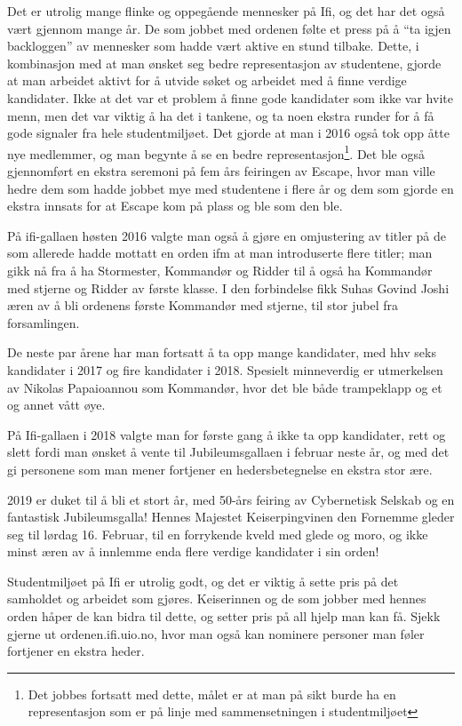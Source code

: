 Det er utrolig mange flinke og oppegående mennesker på Ifi, og det har det også vært gjennom mange år. De som jobbet med ordenen følte et press på å ``ta igjen backloggen'' av mennesker som hadde vært aktive en stund tilbake. Dette, i kombinasjon med at man ønsket seg bedre representasjon av studentene, gjorde at man arbeidet aktivt for å utvide søket og arbeidet med å finne verdige kandidater. Ikke at det var et problem å finne gode kandidater som ikke var hvite menn, men det var viktig å ha det i tankene, og ta noen ekstra runder for å få gode signaler fra hele studentmiljøet. Det gjorde at man i 2016 også tok opp åtte nye medlemmer, og man begynte å se en bedre representasjon\footnote{Det jobbes fortsatt med dette, målet er at man på sikt burde ha en representasjon som er på linje med sammensetningen i studentmiljøet}. Det ble også gjennomført en ekstra seremoni på fem års feiringen av Escape, hvor man ville hedre dem som hadde jobbet mye med studentene i flere år og dem som gjorde en ekstra innsats for at Escape kom på plass og ble som den ble. 

På ifi-gallaen høsten 2016 valgte man også å gjøre en omjustering av titler på de som allerede hadde mottatt en orden ifm at man introduserte flere titler; man gikk nå fra å ha Stormester, Kommandør og Ridder til å også ha Kommandør med stjerne og Ridder av første klasse. I den forbindelse fikk Suhas Govind Joshi æren av å bli ordenens første Kommandør med stjerne, til stor jubel fra forsamlingen.

De neste par årene har man fortsatt å ta opp mange kandidater, med hhv seks kandidater i 2017 og fire kandidater i 2018. Spesielt minneverdig er utmerkelsen av Nikolas Papaioannou som Kommandør, hvor det ble både trampeklapp og et og annet vått øye. 

På Ifi-gallaen i 2018 valgte man for første gang å ikke ta opp kandidater, rett og slett fordi man ønsket å vente til Jubileumsgallaen i februar neste år, og med det gi personene som man mener fortjener en hedersbetegnelse en ekstra stor ære.

2019 er duket til å bli et stort år, med 50-års feiring av Cybernetisk Selskab og en fantastisk Jubileumsgalla! Hennes Majestet Keiserpingvinen den Fornemme gleder seg til lørdag 16. Februar, til en forrykende kveld med glede og moro, og ikke minst æren av å innlemme enda flere verdige kandidater i sin orden!

Studentmiljøet på Ifi er utrolig godt, og det er viktig å sette pris på det samholdet og arbeidet som gjøres. Keiserinnen og de som jobber med hennes orden håper de kan bidra til dette, og setter pris på all hjelp man kan få. Sjekk gjerne ut ordenen.ifi.uio.no, hvor man også kan nominere personer man føler fortjener en ekstra heder.
